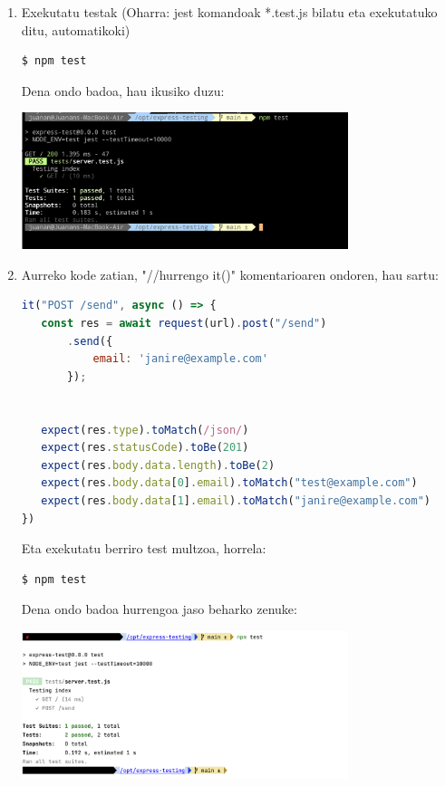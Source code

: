 \begin{enumerate}
\item 
Exekutatu testak 
(Oharra: jest komandoak *.test.js bilatu eta exekutatuko ditu, automatikoki)
\begin{verbatim}
$ npm test    
\end{verbatim}

Dena ondo badoa, hau ikusiko duzu:

\includegraphics[width=0.75\textwidth]{img/testing/testing_npm_test.png}

\item 
Aurreko kode zatian, "//hurrengo it()" komentarioaren ondoren, hau sartu:

\begin{lstlisting}[language=JavaScript,numbers=none]
    it("POST /send", async () => {
   const res = await request(url).post("/send")
       .send({
           email: 'janire@example.com'
       });


   expect(res.type).toMatch(/json/)
   expect(res.statusCode).toBe(201)
   expect(res.body.data.length).toBe(2)
   expect(res.body.data[0].email).toMatch("test@example.com")
   expect(res.body.data[1].email).toMatch("janire@example.com")
})
\end{lstlisting}


Eta exekutatu berriro test multzoa, horrela:
\begin{verbatim}
$ npm test    
\end{verbatim}

Dena ondo badoa hurrengoa jaso beharko zenuke:

\includegraphics[width=0.75\textwidth]{img/testing/testing_npm_test_results.png}


\end{enumerate}
